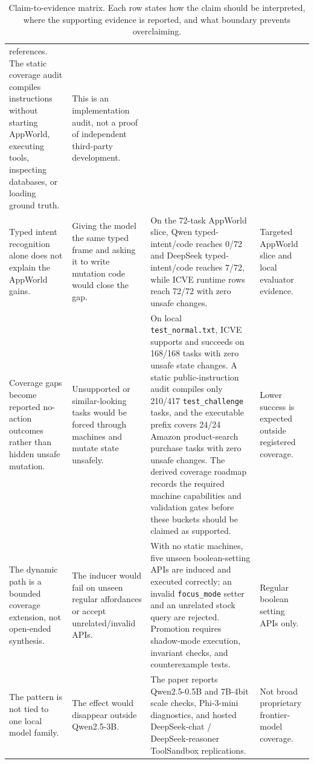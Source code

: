 \documentclass[11pt]{article}
\begin{document}
\begin{table}[t]
\begin{tabular}{p{}p{}p{}p{}}
references. The static coverage audit compiles instructions without starting AppWorld,
executing tools, inspecting databases, or loading ground truth. &
This is an implementation audit, not a proof of independent third-party development. \\
\addlinespace
Typed intent recognition alone does not explain the AppWorld gains. &
Giving the model the same typed frame and asking it to write mutation code would close
the gap. &
On the 72-task AppWorld slice, Qwen typed-intent/code reaches 0/72 and DeepSeek
typed-intent/code reaches 7/72, while ICVE runtime rows reach 72/72 with zero unsafe
changes. &
Targeted AppWorld slice and local evaluator evidence. \\
\addlinespace
Coverage gaps become reported no-action outcomes rather than hidden unsafe mutation. &
Unsupported or similar-looking tasks would be forced through machines and mutate state
unsafely. &
On local \texttt{test\_normal.txt}, ICVE supports and succeeds on 168/168 tasks with
zero unsafe state changes. A static public-instruction audit compiles only 210/417
\texttt{test\_challenge} tasks, and the executable prefix covers 24/24 Amazon
product-search purchase tasks with zero unsafe
changes. The derived coverage roadmap records the required machine capabilities and
validation gates before these buckets should be claimed as supported. &
Lower success is expected outside registered coverage. \\
\addlinespace
The dynamic path is a bounded coverage extension, not open-ended synthesis. &
The inducer would fail on unseen regular affordances or accept unrelated/invalid APIs. &
With no static machines, five unseen boolean-setting APIs are induced and executed
correctly; an invalid \texttt{focus\_mode} setter and an unrelated stock query are
rejected. Promotion requires shadow-mode execution, invariant checks, and counterexample
tests. &
Regular boolean setting APIs only. \\
\addlinespace
The pattern is not tied to one local model family. &
The effect would disappear outside Qwen2.5-3B. &
The paper reports Qwen2.5-0.5B and 7B-4bit scale checks, Phi-3-mini diagnostics, and
hosted DeepSeek-chat / DeepSeek-reasoner ToolSandbox replications. &
Not broad proprietary frontier-model coverage. \\
\bottomrule
\end{tabular}
\caption{Claim-to-evidence matrix. Each row states how the claim should be interpreted,
where the supporting evidence is reported, and what boundary prevents overclaiming.}
\label{tab:claim-evidence}
\end{table}
\end{document}
